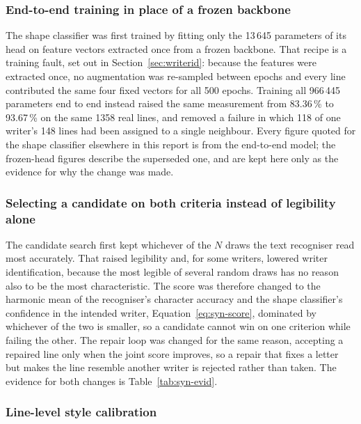 \subsubsection{End-to-end training in place of a frozen backbone}
\label{sec:later-endtoend}

The shape classifier was first trained by fitting only the 13\,645 parameters of its head on feature vectors extracted once from a frozen backbone. That recipe is a training fault, set out in Section~\ref{sec:writerid}: because the features were extracted once, no augmentation was re-sampled between epochs and every line contributed the same four fixed vectors for all 500 epochs. Training all 966\,445 parameters end to end instead raised the same measurement from 83.36\,\% to 93.67\,\% on the same 1358 real lines, and removed a failure in which 118 of one writer's 148 lines had been assigned to a single neighbour. Every figure quoted for the shape classifier elsewhere in this report is from the end-to-end model; the frozen-head figures describe the superseded one, and are kept here only as the evidence for why the change was made.

\subsubsection{Selecting a candidate on both criteria instead of legibility alone}
\label{sec:later-joint}

The candidate search first kept whichever of the $N$ draws the text recogniser read most accurately. That raised legibility and, for some writers, lowered writer identification, because the most legible of several random draws has no reason also to be the most characteristic. The score was therefore changed to the harmonic mean of the recogniser's character accuracy and the shape classifier's confidence in the intended writer, Equation~\ref{eq:syn-score}, dominated by whichever of the two is smaller, so a candidate cannot win on one criterion while failing the other. The repair loop was changed for the same reason, accepting a repaired line only when the joint score improves, so a repair that fixes a letter but makes the line resemble another writer is rejected rather than taken. The evidence for both changes is Table~\ref{tab:syn-evid}.

\subsubsection{Line-level style calibration}
\label{sec:later-cal}

